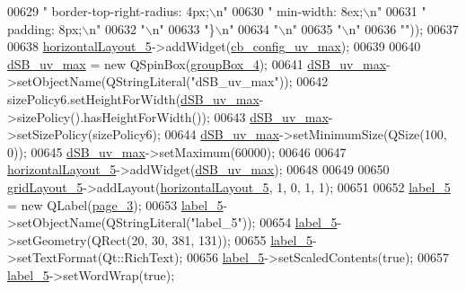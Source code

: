 \begin{DoxyCode}
00629 \textcolor{stringliteral}{"     border-top-right-radius: 4px;\(\backslash\)n"}
00630 \textcolor{stringliteral}{"     min-width: 8ex;\(\backslash\)n"}
00631 \textcolor{stringliteral}{"     padding: 8px;\(\backslash\)n"}
00632 \textcolor{stringliteral}{"\(\backslash\)n"}
00633 \textcolor{stringliteral}{"\}\(\backslash\)n"}
00634 \textcolor{stringliteral}{"\(\backslash\)n"}
00635 \textcolor{stringliteral}{"\(\backslash\)n"}
00636 \textcolor{stringliteral}{""}));
00637 
00638         \hyperlink{a00080_a14c9d4842c3e97e16e7873ef0aecdb1e}{horizontalLayout\_5}->addWidget(\hyperlink{a00080_a13ce5fddc83683d7b8b717f0b9a4e2cf}{cb\_config\_uv\_max});
00639 
00640         \hyperlink{a00080_aa2872ada374dace81c4f1cc41d8e244d}{dSB\_uv\_max} = \textcolor{keyword}{new} QSpinBox(\hyperlink{a00080_ad8a919e5634add9c41bfc319cb9fd338}{groupBox\_4});
00641         \hyperlink{a00080_aa2872ada374dace81c4f1cc41d8e244d}{dSB\_uv\_max}->setObjectName(QStringLiteral(\textcolor{stringliteral}{"dSB\_uv\_max"}));
00642         sizePolicy6.setHeightForWidth(\hyperlink{a00080_aa2872ada374dace81c4f1cc41d8e244d}{dSB\_uv\_max}->sizePolicy().hasHeightForWidth());
00643         \hyperlink{a00080_aa2872ada374dace81c4f1cc41d8e244d}{dSB\_uv\_max}->setSizePolicy(sizePolicy6);
00644         \hyperlink{a00080_aa2872ada374dace81c4f1cc41d8e244d}{dSB\_uv\_max}->setMinimumSize(QSize(100, 0));
00645         \hyperlink{a00080_aa2872ada374dace81c4f1cc41d8e244d}{dSB\_uv\_max}->setMaximum(60000);
00646 
00647         \hyperlink{a00080_a14c9d4842c3e97e16e7873ef0aecdb1e}{horizontalLayout\_5}->addWidget(\hyperlink{a00080_aa2872ada374dace81c4f1cc41d8e244d}{dSB\_uv\_max});
00648 
00649 
00650         \hyperlink{a00080_a8731b71c513ff94baf59614807823c5d}{gridLayout\_5}->addLayout(\hyperlink{a00080_a14c9d4842c3e97e16e7873ef0aecdb1e}{horizontalLayout\_5}, 1, 0, 1, 1);
00651 
00652         \hyperlink{a00080_ad6bab8fb8903b8f41afea1218ee52695}{label\_5} = \textcolor{keyword}{new} QLabel(\hyperlink{a00080_ac682cb2a9b686ca7c3d29771ad9ccb48}{page\_3});
00653         \hyperlink{a00080_ad6bab8fb8903b8f41afea1218ee52695}{label\_5}->setObjectName(QStringLiteral(\textcolor{stringliteral}{"label\_5"}));
00654         \hyperlink{a00080_ad6bab8fb8903b8f41afea1218ee52695}{label\_5}->setGeometry(QRect(20, 30, 381, 131));
00655         \hyperlink{a00080_ad6bab8fb8903b8f41afea1218ee52695}{label\_5}->setTextFormat(Qt::RichText);
00656         \hyperlink{a00080_ad6bab8fb8903b8f41afea1218ee52695}{label\_5}->setScaledContents(\textcolor{keyword}{true});
00657         \hyperlink{a00080_ad6bab8fb8903b8f41afea1218ee52695}{label\_5}->setWordWrap(\textcolor{keyword}{true});

\end{DoxyCode}
